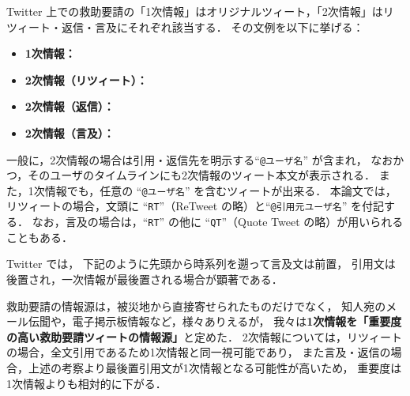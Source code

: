 \documentclass[japanese]{jnlp_1.4}
\newcommand{\twitter}[3]{}
\begin{document}
Twitter 上での救助要請の「1次情報」はオリジナルツィート，「2次情報」はリツィート・返信・言及にそれぞれ該当する．
その文例を以下に挙げる：
\begin{itemize}
\item {\bf 1次情報：}
  \begin{quote}
  \twitter{【拡散希望】宮城県の○○病院で100人以上孤立している模様． \#j\_j\_helpme\\}{2011/3/12 01:23:45}{foo}        
  \end{quote}
\item {\bf 2次情報（リツィート）：}
  \begin{quote}
    \twitter{RT @foo:【拡散希望】宮城県の○○病院で100人以上孤立している模様． \#j\_j\_helpme}{2011/3/12 01:23:45}{bar}      
  \end{quote}
\item {\bf 2次情報（返信）：}
  \begin{quote}
    \twitter{@foo 本件について，どなたも通報されていないようでしたので，警察へ通報致しました．\#j\_j\_helpme}{2011/3/12 12:34:50}{baz}      
  \end{quote}
\item {\bf 2次情報（言及）：}
  \begin{quote}
    \twitter{どなたか本件の情報発信元をご存じの方はいらっしゃらないですか? 
      RT @foo: 【拡散希望】宮城県の○○病院で100人以上孤立している模様．\#j\_j\_helpme\\
    }{2011/3/12 01:30:00}{bar}
  \end{quote}
\end{itemize}
一般に，2次情報の場合は引用・返信先を明示する``{\tt @ユーザ名}'' が含まれ，
なおかつ，そのユーザのタイムラインにも2次情報のツィート本文が表示される．
また，1次情報でも，任意の ``{\tt @ユーザ名}'' を含むツィートが出来る．
本論文では，リツィートの場合，文頭に ``{\tt RT}''（ReTweet の略）と``{\tt @引用元ユーザ名}'' を付記する．
なお，言及の場合は，``{\tt RT}'' の他に ``{\tt QT}''（Quote Tweet の略）が用いられることもある．

Twitter では，
下記のように先頭から時系列を遡って言及文は前置，
引用文は後置され，一次情報が最後置される場合が顕著である．
\begin{quote}
  \twitter{user2への言及文 RT @user2: user3への言及文 RT @user3 \\$\ldots$ RT @user$n$: 一次情報}{YYYY/MM/DD hh:mm:ss}{user1}    
\end{quote}

救助要請の情報源は，被災地から直接寄せられたものだけでなく，
知人宛のメール伝聞や，電子掲示板情報など，様々ありえるが，
我々は{\bf 1次情報を「重要度の高い救助要請ツィートの情報源」}と定めた．
2次情報については，リツィートの場合，全文引用であるため1次情報と同一視可能であり，
また言及・返信の場合，上述の考察より最後置引用文が1次情報となる可能性が高いため，
重要度は1次情報よりも相対的に下がる．
\end{document}
